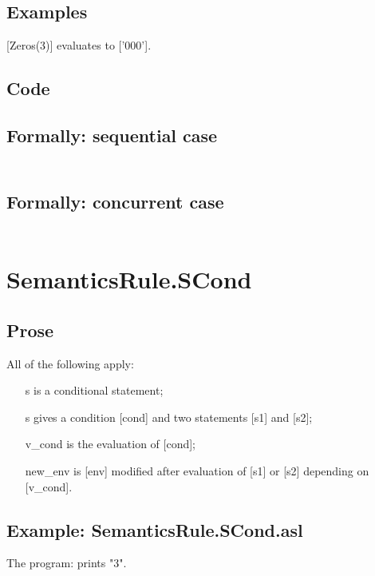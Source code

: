\documentclass{book}
\begin{document}
    \subsection{Examples}
    [Zeros(3)] evaluates to ['000'].

  \subsection{Code}

  \subsection{Formally: sequential case}
  \begin{align}
  \end{align} 

  \subsection{Formally: concurrent case}
  \begin{align}
  \end{align} 

\section{SemanticsRule.SCond \label{sec:SemanticsRule.SCond}}

    \subsection{Prose}
    All of the following apply:
    \begin{itemize}
    \item [s] is a conditional statement;
    \item [s] gives a condition [cond] and two statements [s1] and [s2];
    \item [v\_cond] is the evaluation of [cond];
    \item [new\_env] is [env] modified after evaluation of [s1] or [s2] depending on
      [v\_cond].
    \end{itemize}

    \subsection{Example: SemanticsRule.SCond.asl}
    The program:
    prints "3".
\end{document}
